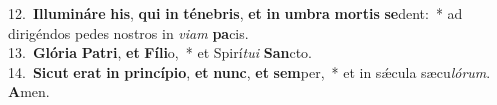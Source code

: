 {12.~}\textbf{Il}\textbf{lu}\textbf{mi}\textbf{ná}\textbf{re} \textbf{his}, \textbf{qui} \textbf{in} \textbf{té}\textbf{ne}\textbf{bris}, \textbf{et} \textbf{in} \textbf{um}\textbf{bra} \textbf{mor}\textbf{tis} \textbf{se}dent:~* ad dirigéndos pedes nostros in \textit{vi}\textit{am} \textbf{pa}cis.\\
{13.~}\textbf{Gló}\textbf{ri}\textbf{a} \textbf{Pa}\textbf{tri}, \textbf{et} \textbf{Fí}\textbf{li}o,~* et Spirí\textit{tu}\textit{i} \textbf{San}cto.\\
{14.~}\textbf{Si}\textbf{cut} \textbf{e}\textbf{rat} \textbf{in} \textbf{prin}\textbf{cí}\textbf{pi}\textbf{o}, \textbf{et} \textbf{nunc}, \textbf{et} \textbf{sem}per,~* et in sǽcula sæcu\textit{ló}\textit{rum}. \textbf{A}men.\\
